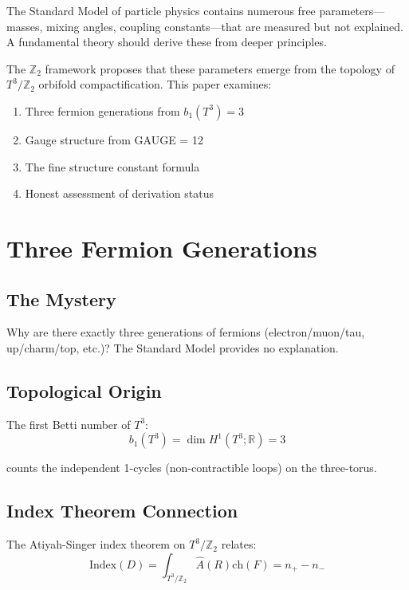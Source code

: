 \documentclass[12pt,a4paper]{article}
\begin{document}
The Standard Model of particle physics contains numerous free parameters---masses, mixing angles, coupling constants---that are measured but not explained. A fundamental theory should derive these from deeper principles.

The $\mathbb{Z}_2$ framework proposes that these parameters emerge from the topology of $T^3/\mathbb{Z}_2$ orbifold compactification. This paper examines:
\begin{enumerate}
    \item Three fermion generations from $b_1(T^3) = 3$
    \item Gauge structure from GAUGE = 12
    \item The fine structure constant formula
    \item Honest assessment of derivation status
\end{enumerate}

\section{Three Fermion Generations}

\subsection{The Mystery}

Why are there exactly three generations of fermions (electron/muon/tau, up/charm/top, etc.)? The Standard Model provides no explanation.

\subsection{Topological Origin}

The first Betti number of $T^3$:
\begin{equation}
b_1(T^3) = \dim H^1(T^3; \mathbb{R}) = 3
\end{equation}

counts the independent 1-cycles (non-contractible loops) on the three-torus.

\subsection{Index Theorem Connection}

The Atiyah-Singer index theorem on $T^3/\mathbb{Z}_2$ relates:
\begin{equation}
\text{Index}(D) = \int_{T^3/\mathbb{Z}_2} \hat{A}(R) \text{ch}(F) = n_+ - n_-
\end{equation}
\end{document}

